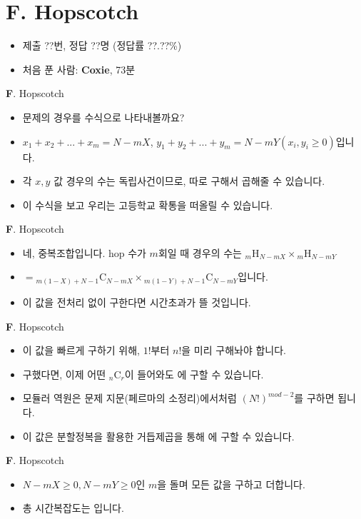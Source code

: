 \section{F. Hopscotch}

\begin{frame} %
    \begin{itemize}
        \item 제출 ??번, 정답 ??명 (정답률 ??.??\%)
        \item 처음 푼 사람: \textbf{Coxie}, 73분
    \end{itemize}
\end{frame}

\begin{frame}{\textbf{F}. Hopscotch}
    \begin{itemize}
        \item 문제의 경우를 수식으로 나타내볼까요?
        \item $x_{1}+x_{2}+...+x_{m}=N-mX$, $y_{1}+y_{2}+...+y_{m}=N-mY (x_{i}, y_{i} \geq 0)$입니다.
        \item 각 $x, y$ 값 경우의 수는 독립사건이므로, 따로 구해서 곱해줄 수 있습니다.
        \item 이 수식을 보고 우리는 고등학교 확통을 떠올릴 수 있습니다.
    \end{itemize}
\end{frame}

\begin{frame}{\textbf{F}. Hopscotch}
    \begin{itemize}
        \item 네, 중복조합입니다. hop 수가 $m$회일 때 경우의 수는 ${}_m \mathrm{H}_{N-mX} \times {}_m \mathrm{H}_{N-mY}$
        \item $= {}_{m(1-X)+N-1} \mathrm{C}_{N-mX} \times {}_{m(1-Y)+N-1} \mathrm{C}_{N-mY}$입니다.
        \item 이 값을 전처리 없이 구한다면 시간초과가 뜰 것입니다.
    \end{itemize}
\end{frame}

\begin{frame}{\textbf{F}. Hopscotch}
    \begin{itemize}
        \item 이 값을 빠르게 구하기 위해, $1!$부터 $n!$을 미리 구해놔야 합니다.
        \item 구했다면, 이제 어떤 ${}_{n} \mathrm{C}_{r}$이 들어와도  에 구할 수 있습니다.
        \item 모듈러 역원은 문제 지문(페르마의 소정리)에서처럼 $(N!)^{mod-2}$를 구하면 됩니다.
        \item 이 값은 분할정복을 활용한 거듭제곱을 통해  에 구할 수 있습니다.
    \end{itemize}
\end{frame}

\begin{frame}{\textbf{F}. Hopscotch}
    \begin{itemize}
        \item $N-mX \geq 0, N-mY \geq 0$인 $m$을 돌며 모든 값을 구하고 더합니다.
        \item 총 시간복잡도는 입니다.
    \end{itemize}
\end{frame}
